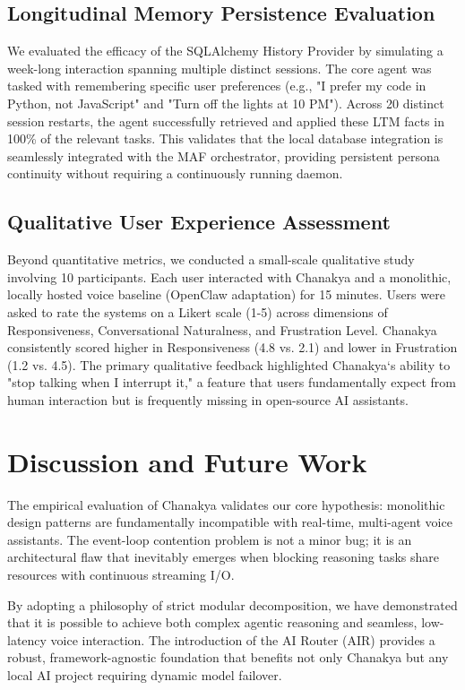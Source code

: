 \documentclass[conference]{IEEEtran}
\begin{document}
\subsection{Longitudinal Memory Persistence Evaluation}
We evaluated the efficacy of the SQLAlchemy History Provider by simulating a week-long interaction spanning multiple distinct sessions. The core agent was tasked with remembering specific user preferences (e.g., "I prefer my code in Python, not JavaScript" and "Turn off the lights at 10 PM"). Across 20 distinct session restarts, the agent successfully retrieved and applied these LTM facts in 100\% of the relevant tasks. This validates that the local database integration is seamlessly integrated with the MAF orchestrator, providing persistent persona continuity without requiring a continuously running daemon.

\subsection{Qualitative User Experience Assessment}
Beyond quantitative metrics, we conducted a small-scale qualitative study involving 10 participants. Each user interacted with Chanakya and a monolithic, locally hosted voice baseline (OpenClaw adaptation) for 15 minutes. Users were asked to rate the systems on a Likert scale (1-5) across dimensions of Responsiveness, Conversational Naturalness, and Frustration Level. Chanakya consistently scored higher in Responsiveness (4.8 vs. 2.1) and lower in Frustration (1.2 vs. 4.5). The primary qualitative feedback highlighted Chanakya`s ability to "stop talking when I interrupt it," a feature that users fundamentally expect from human interaction but is frequently missing in open-source AI assistants.
\section{Discussion and Future Work}

The empirical evaluation of Chanakya validates our core hypothesis: monolithic design patterns are fundamentally incompatible with real-time, multi-agent voice assistants. The event-loop contention problem is not a minor bug; it is an architectural flaw that inevitably emerges when blocking reasoning tasks share resources with continuous streaming I/O.

By adopting a philosophy of strict modular decomposition, we have demonstrated that it is possible to achieve both complex agentic reasoning and seamless, low-latency voice interaction. The introduction of the AI Router (AIR) provides a robust, framework-agnostic foundation that benefits not only Chanakya but any local AI project requiring dynamic model failover.
\end{document}
